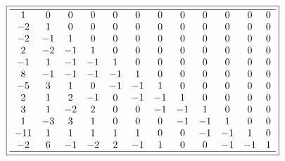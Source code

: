 \documentclass[10pt,reqno]{amsart}
\numberwithin{figure}{section}
\numberwithin{table}{section}
\theoremstyle{plain}
\numberwithin{theorem}{section}
\theoremstyle{remark}
\begin{document}
\begin{figure}[ht!]

\begin{minipage}{\linewidth} 
\begin{center} 
\tiny
\begin{equation*} 
\boxed{ 
\begin{array}{cccccccccccccccccc} \hline 
 1 & 0 & 0 & 0 & 0 & 0 & 0 & 0 & 0 & 0 & 0 & 0 \\
 -2 & 1 & 0 & 0 & 0 & 0 & 0 & 0 & 0 & 0 & 0 & 0 \\
 -2 & -1 & 1 & 0 & 0 & 0 & 0 & 0 & 0 & 0 & 0 & 0 \\
 2 & -2 & -1 & 1 & 0 & 0 & 0 & 0 & 0 & 0 & 0 & 0 \\
 -1 & 1 & -1 & -1 & 1 & 0 & 0 & 0 & 0 & 0 & 0 & 0 \\
 8 & -1 & -1 & -1 & -1 & 1 & 0 & 0 & 0 & 0 & 0 & 0 \\
 -5 & 3 & 1 & 0 & -1 & -1 & 1 & 0 & 0 & 0 & 0 & 0 \\
 2 & 1 & 2 & -1 & 0 & -1 & -1 & 1 & 0 & 0 & 0 & 0 \\
 3 & 1 & -2 & 2 & 0 & 0 & -1 & -1 & 1 & 0 & 0 & 0 \\
 1 & -3 & 3 & 1 & 0 & 0 & 0 & -1 & -1 & 1 & 0 & 0 \\
 -11 & 1 & 1 & 1 & 1 & 1 & 0 & 0 & -1 & -1 & 1 & 0 \\
 -2 & 6 & -1 & -2 & 2 & -1 & 1 & 0 & 0 & -1 & -1 & 1 \\
 \hline
\end{array}
}
\end{equation*}
\end{center} 
\end{minipage} 


\end{figure}
\end{document}
